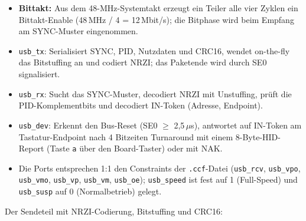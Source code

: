 \documentclass[a4paper,11pt]{article}
\begin{document}
\begin{itemize}
	\item \textbf{Bittakt:} Aus dem 48-MHz-Systemtakt erzeugt ein Teiler alle vier Zyklen ein Bittakt-Enable (48\,MHz / 4 = 12\,Mbit/s); die Bitphase wird beim Empfang am SYNC-Muster eingenommen.
	\item \texttt{usb\_tx}: Serialisiert SYNC, PID, Nutzdaten und CRC16, wendet on-the-fly das Bitstuffing an und codiert NRZI; das Paketende wird durch SE0 signalisiert.
	\item \texttt{usb\_rx}: Sucht das SYNC-Muster, decodiert NRZI mit Unstuffing, prüft die PID-Komplementbits und decodiert IN-Token (Adresse, Endpoint).
	\item \texttt{usb\_dev}: Erkennt den Bus-Reset (SE0 $\geq$ 2,5\,$\mu$s), antwortet auf IN-Token am Tastatur-Endpoint nach 4 Bitzeiten Turnaround mit einem 8-Byte-HID-Report (Taste \texttt{a} über den Board-Taster) oder mit NAK.
	\item Die Ports entsprechen 1:1 den Constraints der \texttt{.ccf}-Datei (\texttt{usb\_rcv}, \texttt{usb\_vpo}, \texttt{usb\_vmo}, \texttt{usb\_vp}, \texttt{usb\_vm}, \texttt{usb\_oe}); \texttt{usb\_speed} ist fest auf 1 (Full-Speed) und \texttt{usb\_susp} auf 0 (Normalbetrieb) gelegt.
\end{itemize}

Der Sendeteil mit NRZI-Codierung, Bitstuffing und CRC16:
\end{document}
